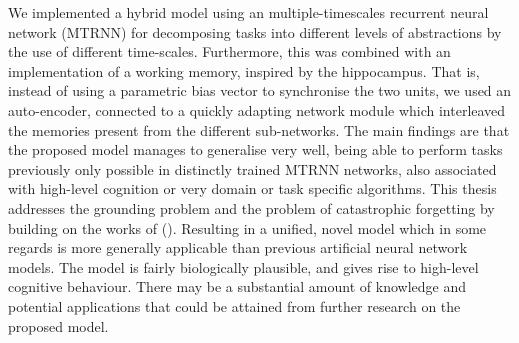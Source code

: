 We implemented a hybrid model using an multiple-timescales recurrent neural network (MTRNN) for decomposing tasks into different levels of abstractions by the use of different time-scales. Furthermore, this was combined with an implementation of a working memory, inspired by the hippocampus. That is, instead of using a parametric bias vector to synchronise the two units, we used an auto-encoder, connected to a quickly adapting network module which interleaved the memories present from the different sub-networks. The main findings are that the proposed model manages to generalise very well, being able to perform tasks previously only possible in distinctly trained MTRNN networks, also associated with high-level cognition or very domain or task specific algorithms. This thesis addresses the grounding problem and the problem of catastrophic forgetting by building on the works of (\cite{McClelland1995, Hattori2014, Tani2014}). Resulting in a unified, novel model which in some regards is more generally applicable than previous artificial neural network models. The model is fairly biologically plausible, and gives rise to high-level cognitive behaviour. There may be a substantial amount of knowledge and potential applications that could be attained from further research on the proposed model.

\clearpage